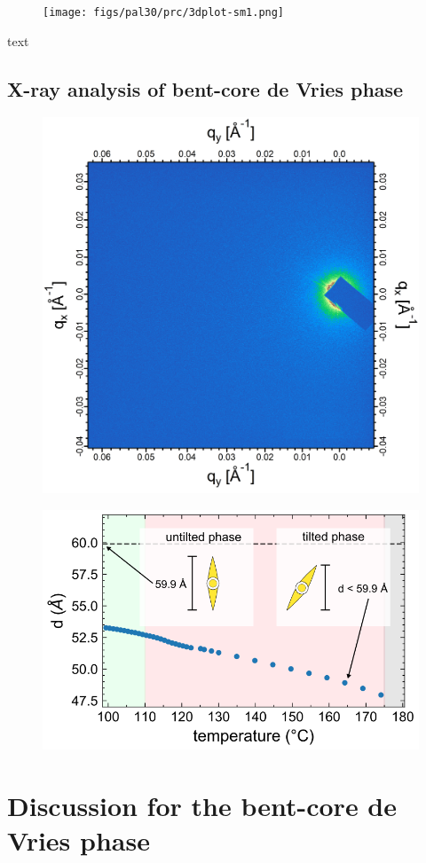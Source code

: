 \documentclass[aagreenthesis]{subfiles}
\begin{document}
\begin{figure}[h!]
    \centering
    \texttt{[image: figs/pal30/prc/3dplot-sm1.png]}
    \caption{\label{}}
\end{figure}
text

\subsection{X-ray analysis of bent-core de Vries phase}

\begin{figure}[h!]
    \centering
    \includegraphics[width=.8\textwidth]{figs/pal30/xraysm1/rsosxSmaT113-modified.png}
    \caption{\label{}}
\end{figure}


\begin{figure}[h!]
    \centering
    \includegraphics{figs/pal30/xraysm1/sm1-saxs-annote.png}
    \caption{\label{}}
\end{figure}




\section{Discussion for the bent-core de Vries phase}
\biblio
\end{document}
